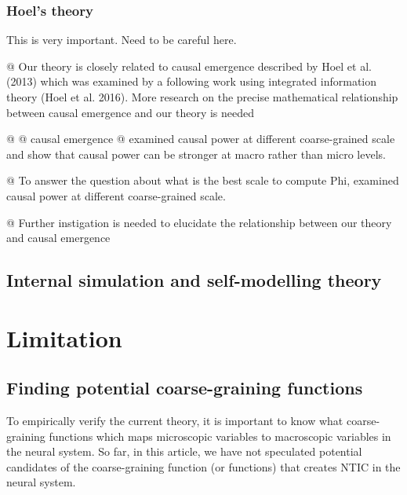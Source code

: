 \documentclass[utf8]{article}
\newenvironment{ants}
			{
			 \begin{easylist}[itemize]
		 	}
			{
			\end{easylist}
			} %
\newcommand{\ideaBox}[1]{
			    \vspace{2mm}
				\begin{tcolorbox}[enhanced,%
                    title=-,
                    center,
                    fontupper=\small,
                    lifted shadow={1mm}{-2mm}{3mm}{0.1mm}{black!50!white},%
                    boxrule=0.4pt,
                    width=9cm,
                    colback=Thistle!50!white,
                    sharp corners]
					#1
				\end{tcolorbox}
				\vspace{2mm}
			}
\newcommand{\needhelp}[1]{\todo[color=SpringGreen]{[Need Help]: #1}}
\newcommand{\rlend}{\cbend}
\begin{document}
			\subsubsection{Hoel's theory\needhelp{Help from Martin?}}
				\ideaBox{This is very important. Need to be careful here.}


				\begin{ants}
				
				    @ Our theory is closely related to causal emergence described by Hoel et al. (2013) which was examined by a following work using integrated information theory (Hoel et al. 2016). More research on the precise mathematical relationship between causal emergence and our theory is needed
				    
					@ \cite{hoel2016can}
					@ causal emergence
					@ \cite{hoel2013quantifying} examined causal power at different coarse-grained scale and show that causal power can be stronger at macro rather than micro levels.


					@ To answer the question about what is the best scale to compute Phi, \cite{hoel2016can} examined causal power at different coarse-grained scale.

					@ Further instigation is needed to elucidate the relationship between our theory and causal emergence


				\end{ants}

\rlend

		\subsection{Internal simulation and self-modelling theory}



    \section{Limitation}
    
    \subsection{Finding potential coarse-graining functions}
    To empirically verify the current theory, it is important to know what coarse-graining functions which maps microscopic variables to macroscopic variables in the neural system. So far, in this article, we have not speculated potential candidates of the coarse-graining function (or functions) that creates NTIC in the neural system. 
    
\end{document}
